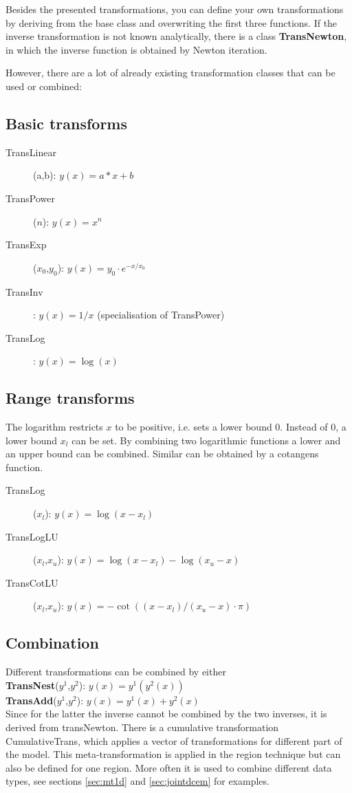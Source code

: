 Besides the presented transformations, you can define your own transformations by deriving from the base class and overwriting the first three functions.
If the inverse transformation is not known analytically, there is a class {\bf TransNewton}, in which the inverse function is obtained by Newton iteration.

However, there are a lot of already existing transformation classes that can be used or combined:

\subsection*{Basic transforms}
\begin{description}
\item[TransLinear](a,b): $y(x)=a*x+b$
\item[TransPower]($n$): $y(x)=x^n$
\item[TransExp]($x_0$,$y_0$): $y(x)=y_0\cdot e^{-x/x_0}$
\item[TransInv]: $y(x)=1/x$ (specialisation of TransPower)
\item[TransLog]: $y(x)=\log(x)$
\end{description}

\subsection*{Range transforms}
The logarithm restricts $x$ to be positive, i.e. sets a lower bound 0.
Instead of 0, a lower bound $x_l$ can be set.
By combining two logarithmic functions a lower and an upper bound can be combined.
Similar can be obtained by a cotangens function.

\begin{description}
\item[TransLog]($x_l$): $y(x)=\log(x-x_l)$
\item[TransLogLU]($x_l$,$x_u$): $y(x)=\log(x-x_l)-\log(x_u-x)$
\item[TransCotLU]($x_l$,$x_u$): $y(x)=-\cot((x-x_l)/(x_u-x)\cdot\pi)$
\end{description}

\subsection*{Combination}
Different transformations can be combined by either\\
{\bf TransNest}($y^1$,$y^2$): $y(x)=y^1(y^2(x))$\\
{\bf TransAdd}($y^1$,$y^2$): $y(x)=y^1(x)+y^2(x)$\\
Since for the latter the inverse cannot be combined by the two inverses, it is derived from transNewton.
There is a cumulative transformation CumulativeTrans, which applies a vector of transformations for different part of the model.
This meta-transformation is applied in the region technique but can also be defined for one region.
More often it is used to combine different data types, see sections \ref{sec:mt1d} and \ref{sec:jointdcem} for examples.

